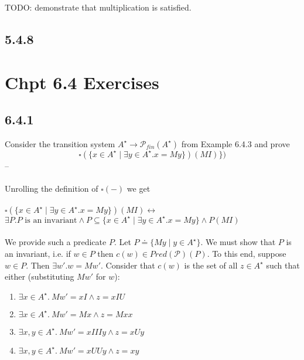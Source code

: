 \documentclass{article}
\begin{document}
\begin{center}
\end{center}

TODO: demonstrate that multiplication is satisfied.

\subsection*{5.4.8}


\section*{Chpt 6.4 Exercises}

\subsection*{6.4.1}

Consider the transition system $A^\star \to \mathcal P_{fin}(A^{\star})$ from Example 6.4.3 and prove
$$\square(\{ x \in A^{\star} \mid \exists y \in A^{\star}. x = My \} ) (MI) \})$$
--\\~\\
Unrolling the definition of $\square(-)$ we get\\~\\
$\square(\{ x \in A^{\star} \mid \exists y \in A^{\star}. x = My \})(MI) \leftrightarrow$\\
$\exists P. P\text{ is an invariant} \wedge P \subseteq \{ x \in A^\star \mid \exists y \in A^\star. x = My \} \wedge P(MI)$\\~\\
We provide such a predicate $P$. Let $P \doteq \{ My \mid y \in A^\star \}$. We must show that $P$ is an invariant, i.e. if $w \in P$ then $c(w) \in \mathit{Pred}(\mathcal P)(P)$. To this end, suppose $w \in P$. Then $\exists w'. w = Mw'$.
Consider that $c(w)$ is the set of all $z \in A^\star$ such that either (substituting $Mw'$ for $w$):
\begin{enumerate}
\item $\exists x \in A^\star.~Mw'=xI \wedge z = xIU$
\item $\exists x \in A^\star.~Mw' = Mx \wedge z = Mxx$
\item $\exists x,y \in A^\star.~Mw'=xIIIy \wedge z = xUy$
\item $\exists x,y \in A^\star.~Mw'=xUUy \wedge z =xy$
\end{enumerate}
\end{document}
